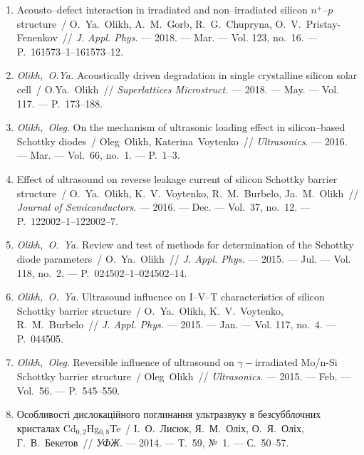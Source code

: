 \begin{center}%
{\textbf{\MakeUppercase{\authorbibtitle}} }
\end{center}%


\begin{enumerate}[label=\arabic*.,leftmargin=1cm,itemindent=0cm]
\item 
Acousto--defect interaction in irradiated and non--irradiated silicon
  $n^+$--$p$ structure~/ O.~Ya.~Olikh, A.~M.~Gorb, R.~G.~Chupryna,
  O.~V.~Pristay-Fenenkov~// \emph{J. Appl. Phys.} --- 2018. --- Mar. ---
 Vol. 123, no.~16. --- P.~161573--1--161573--12.
 
\item 
\emph{Olikh,~O.Ya.} Acoustically driven degradation in single crystalline
  silicon solar cell~/ O.Ya.~Olikh~// \emph{Superlattices Microstruct.} ---
  2018. --- May. ---
  Vol. 117. ---
  P.~173--188.

\item 
\emph{Olikh,~Oleg}. On the mechanism of ultrasonic loading effect in
  silicon--based {S}chottky diodes~/ Oleg~Olikh, Katerina~Voytenko~//
  \emph{Ultrasonics}. ---
  2016. --- Mar. ---
  Vol.~66, no.~1. ---
  P.~1--3.

\item 
Effect of ultrasound on reverse leakage current of silicon {S}chottky barrier
  structure~/ O.~Ya.~Olikh, K.~V.~Voytenko, R.~M.~Burbelo, Ja.~M.~Olikh~//
  \emph{Journal of Semiconductors}. ---
  2016. --- Dec. ---
  Vol.~37, no.~12. ---
  P.~122002--1--122002--7.

\item 
\emph{Olikh,~O.~Ya.} Review and test of methods for determination of the
  {S}chottky diode parameters~/ O.~Ya.~Olikh~// \emph{J. Appl. Phys.} ---
  2015. --- Jul. ---
  Vol. 118, no.~2. ---
  P.~024502--1--024502--14.

\item 
\emph{Olikh,~O.~Ya.} Ultrasound influence on {I}--{V}--{T} characteristics
  of silicon {S}chottky barrier structure~/ O.~Ya.~Olikh, K.~V.~Voytenko,
  R.~M.~Burbelo~// \emph{J. Appl. Phys.} ---
  2015. --- Jan. ---
  Vol. 117, no.~4. ---
  P.~044505.

\item 
\emph{Olikh,~Oleg}. Reversible influence of ultrasound on
  $\gamma-$irradiated {M}o/n-{S}i {S}chottky barrier structure~/ Oleg~Olikh~//
  \emph{Ultrasonics}. ---
  2015. --- Feb. ---
  Vol.~56. ---
  P.~545--550.

\item 
Особливості дислокаційного поглинання
  ультразвуку в безсубблочних кристалах
  {C}d$_{0,2}${H}g$_{0,8}${T}e~/ І.~О.~Лисюк, Я.~М.~Оліх,
  О.~Я.~Оліх, Г.~В.~Бекетов~// \emph{УФЖ}. ---
  2014. ---
  Т.~59, {№}~1. ---
  {С.}~50--57.


\end{enumerate}
